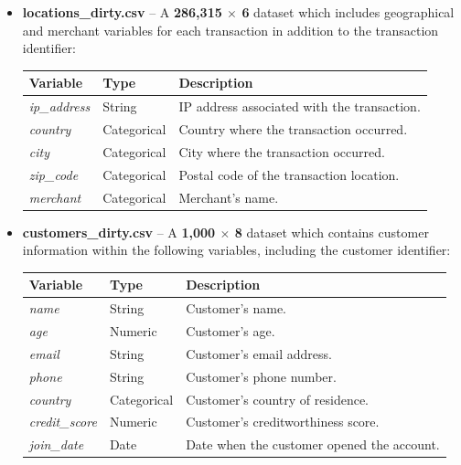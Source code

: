 \documentclass[12pt]{report} %
\begin{document}
\begin{itemize}
    \item \textbf{locations\_dirty.csv} – A \textbf{286,315 $\times$ 6} dataset which includes geographical and merchant variables 
    for each transaction in addition to the transaction identifier:

    \begin{center}
    \begin{tabular}{|l|l|p{8cm}|}
        \hline
        \textbf{Variable} & \textbf{Type} & \textbf{Description} \\
        \hline
        \textit{ip\_address} & String & IP address associated with the transaction. \\
        \hline
        \textit{country} & Categorical & Country where the transaction occurred. \\
        \hline
        \textit{city} & Categorical & City where the transaction occurred. \\
        \hline
        \textit{zip\_code} & Categorical & Postal code of the transaction location. \\
        \hline
        \textit{merchant} & Categorical & Merchant's name. \\
        \hline
    \end{tabular}
    \end{center}

    \item \textbf{customers\_dirty.csv} – A \textbf{1,000 $\times$ 8} dataset which contains customer information 
    within the following variables, including the customer identifier:

    \begin{center}
    \begin{tabular}{|l|l|p{8cm}|}
        \hline
        \textbf{Variable} & \textbf{Type} & \textbf{Description} \\
        \hline
        \textit{name} & String & Customer's name. \\
        \hline
        \textit{age} & Numeric & Customer's age. \\
        \hline
        \textit{email} & String & Customer's email address. \\
        \hline
        \textit{phone} & String & Customer's phone number. \\
        \hline
        \textit{country} & Categorical & Customer's country of residence. \\
        \hline
        \textit{credit\_score} & Numeric & Customer's creditworthiness score. \\
        \hline
        \textit{join\_date} & Date & Date when the customer opened the account. \\
        \hline
    \end{tabular}
    \end{center}
\end{itemize}
    
\end{document}
